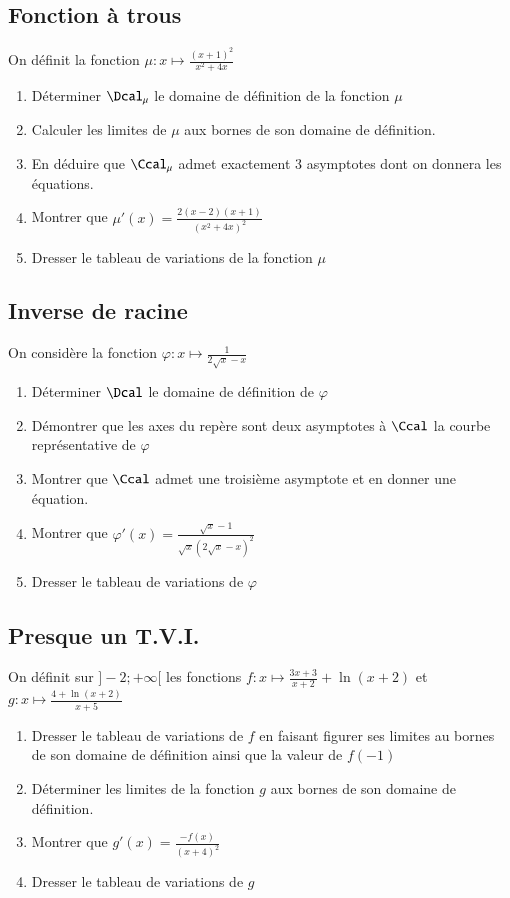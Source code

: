 \documentclass[oneside,12pt]{article}          %
\begin{document}
\subsection{Fonction à trous}
On définit la fonction $\mu : x\mapsto \frac{(x+1)^2}{x^2+4x}$
\begin{enumerate}
	\item Déterminer $\Dcal_\mu$ le domaine de définition de la fonction $\mu$
	\item Calculer les limites de $\mu$ aux bornes de son domaine de définition.
	\item En déduire que $\Ccal_\mu$ admet exactement 3 asymptotes dont on donnera les équations.
	\item Montrer que $\mu'(x)=\frac{2(x-2)(x+1)}{(x^2+4x)^2}$
	\item Dresser le tableau de variations de la fonction $\mu$
\end{enumerate}



\subsection{Inverse de racine}
On considère la fonction $\varphi:x\mapsto \frac{1}{2\sqrt{x}-x}$
\begin{enumerate}
	\item Déterminer $\Dcal$ le domaine de définition de $\varphi$
	\item Démontrer que les axes du repère sont deux asymptotes à $\Ccal$ la courbe représentative de $\varphi$
	\item Montrer que $\Ccal$ admet une troisième asymptote et en donner une équation.
	\item Montrer que $\varphi'(x)=\frac{\sqrt{x}-1}{\sqrt{x}(2\sqrt{x}-x)^2}$
	\item Dresser le tableau de variations de $\varphi$
\end{enumerate}



\subsection{Presque un T.V.I.}
On définit sur $]-2; +\infty[$ les fonctions $f:x\mapsto \frac{3x+3}{x+2}+\ln(x+2)$ et $g : x \mapsto \frac{4 + \ln(x+2)}{x + 5}$
\begin{enumerate}
    \item Dresser le tableau de variations de $f$ en faisant figurer ses limites au bornes de son domaine de définition ainsi que la valeur de $f(-1)$ 
    \item Déterminer les limites de la fonction $g$ aux bornes de son domaine de définition.
    \item Montrer que $g'(x) = \frac{-f(x)}{(x + 4)^2}$
    \item Dresser le tableau de variations de $g$
\end{enumerate}
\end{document}
